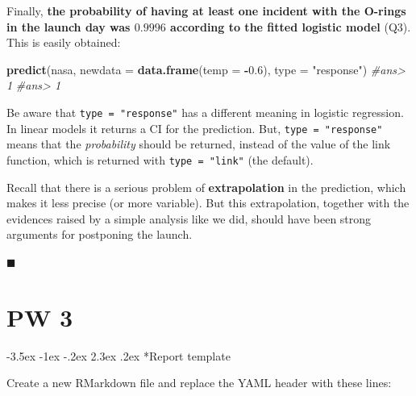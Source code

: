 \documentclass[]{book}
\makeatletter
\newenvironment{Shaded}{\begin{snugshade}}{\end{snugshade}}
\newcommand{\KeywordTok}[1]{\textcolor[rgb]{0.13,0.29,0.53}{\textbf{#1}}}
\newcommand{\DataTypeTok}[1]{\textcolor[rgb]{0.13,0.29,0.53}{#1}}
\newcommand{\FloatTok}[1]{\textcolor[rgb]{0.00,0.00,0.81}{#1}}
\newcommand{\StringTok}[1]{\textcolor[rgb]{0.31,0.60,0.02}{#1}}
\newcommand{\CommentTok}[1]{\textcolor[rgb]{0.56,0.35,0.01}{\textit{#1}}}
\newcommand{\OperatorTok}[1]{\textcolor[rgb]{0.81,0.36,0.00}{\textbf{#1}}}
\newcommand{\NormalTok}[1]{#1}
\renewcommand\section{\@startsection {section}{1}{\z@}%
                                   {-3.5ex \@plus -1ex \@minus -.2ex}%
                                   {2.3ex \@plus.2ex}%
                                   {\normalfont\Large\bfseries\color{ForestGreen}}}
\theoremstyle{definition}
\theoremstyle{definition}
\theoremstyle{definition}
\theoremstyle{remark}
\makeatother
\begin{document}
\begin{Shaded}
\end{Shaded}

Finally, \textbf{the probability of having at least one incident with
the O-rings in the launch day was \(0.9996\) according to the fitted
logistic model} (Q3). This is easily obtained:

\begin{Shaded}
\begin{Highlighting}[]
\KeywordTok{predict}\NormalTok{(nasa, }\DataTypeTok{newdata =} \KeywordTok{data.frame}\NormalTok{(}\DataTypeTok{temp =} \OperatorTok{-}\FloatTok{0.6}\NormalTok{), }\DataTypeTok{type =} \StringTok{"response"}\NormalTok{)}
\CommentTok{#ans> 1 }
\CommentTok{#ans> 1}
\end{Highlighting}
\end{Shaded}

Be aware that \texttt{type\ =\ "response"} has a different meaning in
logistic regression. In linear models it returns a CI for the
prediction. But, \texttt{type\ =\ "response"} means that the
\emph{probability} should be returned, instead of the value of the link
function, which is returned with \texttt{type\ =\ "link"} (the default).

Recall that there is a serious problem of \textbf{extrapolation} in the
prediction, which makes it less precise (or more variable). But this
extrapolation, together with the evidences raised by a simple analysis
like we did, should have been strong arguments for postponing the
launch.

◼

\chapter*{PW 3}\label{pw-3}

\section*{Report template}\label{report-template}

Create a new RMarkdown file and replace the YAML header with these
lines:
\end{document}
